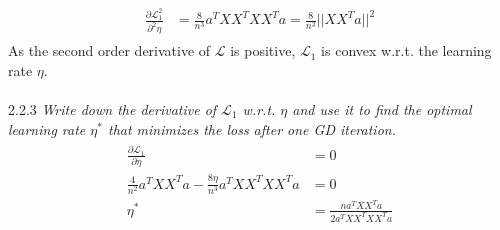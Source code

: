 \documentclass{myhw}
\begin{document}
\begin{homeworkProblem}
\begin{homeworkSection}
\begin{gather*}
\begin{aligned}
\frac{\partial \mathcal{L}_1^2}{\partial^2 \eta} &= \frac{8}{n^3} a^T XX^T XX^Ta = \frac{8}{n^3} ||XX^Ta||^2
\end{aligned}
\end{gather*}
As the second order derivative of $\mathcal{L}$ is positive, $\mathcal{L}_1$ is convex w.r.t. the learning rate $\eta$.
\\ \\
2.2.3 \emph{Write down the derivative of $\mathcal{L}_1$ w.r.t. $\eta$ and use it to find the optimal learning rate $\eta^*$ that minimizes the loss after one GD iteration.} 
\begin{gather*}
\begin{aligned}
\frac{\partial \mathcal{L}_1}{\partial \eta} &= 0 \\
\frac{4}{n^2} a^T XX^T a - \frac{8\eta}{n^3} a^T XX^T XX^Ta &= 0 \\
\eta^* &= \frac{n a^T XX^T a}{2 a^T XX^T XX^Ta}
\end{aligned}
\end{gather*}
\end{homeworkSection}
\end{homeworkProblem}
\end{document}
